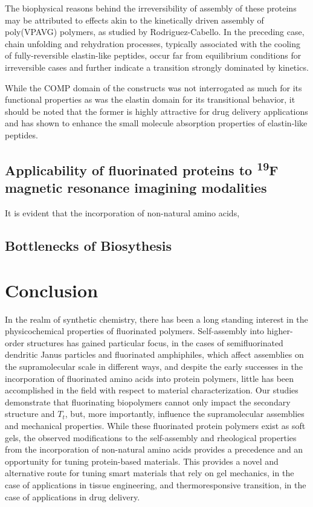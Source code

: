 \begin{refsection}
The biophysical reasons behind the irreversibility of assembly of these proteins
may be attributed to effects akin to the kinetically driven assembly of
poly(VPAVG) polymers, as studied by Rodriguez-Cabello.\cite{Reguera2003} In the
preceding case, chain unfolding and rehydration processes, typically associated
with the cooling of fully-reversible elastin-like peptides, occur far from
equilibrium conditions for irreversible cases and further indicate a transition
strongly dominated by kinetics.

While the COMP domain of the constructs was not interrogated as much for its
functional properties as was the elastin domain for its transitional behavior,
it should be noted that the former is highly attractive for drug delivery
applications and has shown to enhance the small molecule absorption properties
of elastin-like peptides.\cite{Haghpanah2010}

\subsection{Applicability of fluorinated proteins to \textsuperscript{19}F
magnetic resonance imagining modalities} 

It is evident that the incorporation of non-natural amino acids, 

\subsection{Bottlenecks of Biosythesis}


\section{Conclusion}

In the realm of synthetic chemistry, there has been a long standing interest in
the physicochemical properties of fluorinated polymers. Self-assembly into
higher-order structures has gained particular focus, in the cases of
semifluorinated dendritic Janus particles and fluorinated amphiphiles, which
affect assemblies on the supramolecular scale in different ways, and
despite the early successes in the incorporation of fluorinated amino acids into
protein polymers, little has been accomplished in the field with respect to
material characterization. Our studies demonstrate that fluorinating biopolymers
cannot only impact the secondary structure and ${T_t}$, but, more importantly,
influence the supramolecular assemblies and mechanical properties. While these
fluorinated protein polymers exist as soft gels, the observed modifications to
the self-assembly and rheological properties from the incorporation of
non-natural amino acids provides a precedence and an opportunity for tuning
protein-based materials. This provides a novel and alternative route for tuning
smart materials that rely on gel mechanics, in the case of applications in
tissue engineering, and thermoresponsive transition, in the case of applications
in drug delivery. 

\printbibliography[heading=subbibliography]

\end{refsection}
